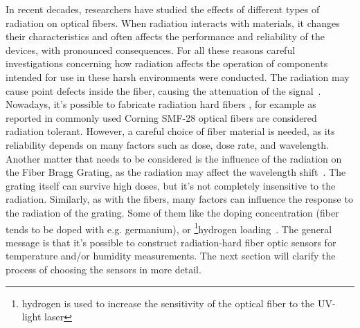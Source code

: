 In recent decades, researchers have studied the effects of different types of radiation on optical fibers. When radiation interacts with materials, it changes their characteristics and often affects the performance and reliability of the devices, with pronounced consequences. For all these reasons careful investigations concerning how radiation affects the operation of components intended for use in these harsh environments were conducted. The radiation may cause point defects inside the fiber, causing the attenuation of the signal~\cite{FOS_FIB_RAD}. Nowadays, it's possible to fabricate radiation hard fibers \cite{troska}, for example as reported in \cite{Berruti} commonly used Corning SMF-28 optical fibers are considered radiation tolerant. However, a careful choice of fiber material is needed, as its reliability depends on many factors such as dose, dose rate, and wavelength.  Another matter that needs to be considered is the influence of the radiation on the Fiber Bragg Grating, as the radiation may affect the wavelength shift~\cite{gusarov}. The grating itself can survive high doses, but it's not completely insensitive to the radiation. Similarly, as with the fibers, many factors can influence the response to the radiation of the grating. Some of them like the doping concentration (fiber tends to be doped with e.g. germanium), or \footnote{hydrogen is used to increase the sensitivity of the optical fiber to the UV-light laser}{hydrogen loading}~\cite{gusarov}. The general message is that it's possible to construct radiation-hard fiber optic sensors for temperature and/or humidity measurements. The next section will clarify the process of choosing the sensors in more detail. 


